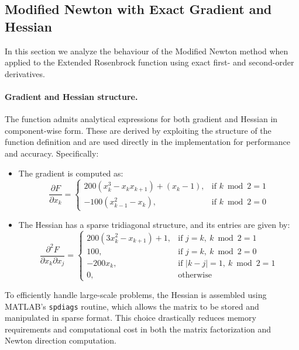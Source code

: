 \documentclass[a4paper,12pt]{article}
\begin{document}
	
	\subsection{Modified Newton with Exact Gradient and Hessian}
	
	In this section we analyze the behaviour of the Modified Newton method when applied to the Extended Rosenbrock function using exact first- and second-order derivatives.
	
	\paragraph{Gradient and Hessian structure.}
	The function admits analytical expressions for both gradient and Hessian in component-wise form. These are derived by exploiting the structure of the function definition and are used directly in the implementation for performance and accuracy. Specifically:
	
	\begin{itemize}[nosep]
		\item The gradient is computed as:
		\[
		\frac{\partial F}{\partial x_k} =
		\begin{cases}
			200(x_k^3 - x_k x_{k+1}) + (x_k - 1), & \text{if } k \bmod 2 = 1 \\
			-100(x_{k-1}^2 - x_k),               & \text{if } k \bmod 2 = 0
		\end{cases}
		\]
		
		\item The Hessian has a sparse tridiagonal structure, and its entries are given by:
		\[
		\frac{\partial^2 F}{\partial x_k \partial x_j} =
		\begin{cases}
			200(3x_k^2 - x_{k+1}) + 1, & \text{if } j = k,\ k \bmod 2 = 1 \\
			100,                      & \text{if } j = k,\ k \bmod 2 = 0 \\
			-200x_k,                  & \text{if } |k - j| = 1,\ k \bmod 2 = 1 \\
			0,                        & \text{otherwise}
		\end{cases}
		\]
		
	\end{itemize}
	
	To efficiently handle large-scale problems, the Hessian is assembled using MATLAB's \verb|spdiags| routine, which allows the matrix to be stored and manipulated in sparse format. This choice drastically reduces memory requirements and computational cost in both the matrix factorization and Newton direction computation.
\end{document}
